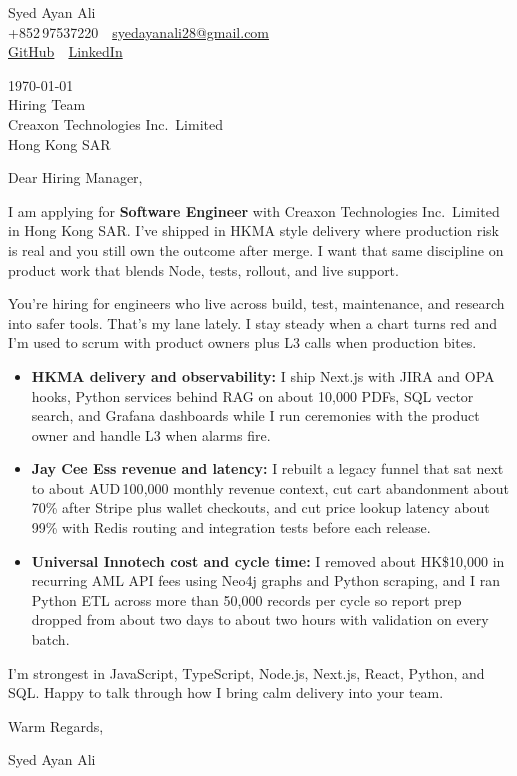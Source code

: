 \documentclass[11pt,a4paper]{article}
\begin{document}
\noindent
Syed Ayan Ali\\
+852\,97537220 \,\textbar\, \href{mailto:syedayanali28@gmail.com}{syedayanali28@gmail.com}\\
\href{https://github.com/syedayanali28}{GitHub} \,\textbar\, \href{https://www.linkedin.com/in/syedayanali/}{LinkedIn}

\vspace{1em}

\noindent
\today\\[0.8em]
Hiring Team\\
Creaxon Technologies Inc.\ Limited\\
Hong Kong SAR

\vspace{1em}

Dear Hiring Manager,

I am applying for \textbf{Software Engineer} with Creaxon Technologies Inc.\ Limited in Hong Kong SAR. I've shipped in HKMA style delivery where production risk is real and you still own the outcome after merge. I want that same discipline on product work that blends Node, tests, rollout, and live support.

You're hiring for engineers who live across build, test, maintenance, and research into safer tools. That's my lane lately. I stay steady when a chart turns red and I'm used to scrum with product owners plus L3 calls when production bites.

\begin{itemize}
\item \textbf{HKMA delivery and observability:} I ship Next.js with JIRA and OPA hooks, Python services behind RAG on about 10{,}000 PDFs, SQL vector search, and Grafana dashboards while I run ceremonies with the product owner and handle L3 when alarms fire.

\item \textbf{Jay Cee Ess revenue and latency:} I rebuilt a legacy funnel that sat next to about AUD\,100{,}000 monthly revenue context, cut cart abandonment about 70\% after Stripe plus wallet checkouts, and cut price lookup latency about 99\% with Redis routing and integration tests before each release.

\item \textbf{Universal Innotech cost and cycle time:} I removed about HK\$10{,}000 in recurring AML API fees using Neo4j graphs and Python scraping, and I ran Python ETL across more than 50{,}000 records per cycle so report prep dropped from about two days to about two hours with validation on every batch.
\end{itemize}

I'm strongest in JavaScript, TypeScript, Node.js, Next.js, React, Python, and SQL. Happy to talk through how I bring calm delivery into your team.

\vspace{1em}

Warm Regards,

\vspace{0.5em}

Syed Ayan Ali
\end{document}

